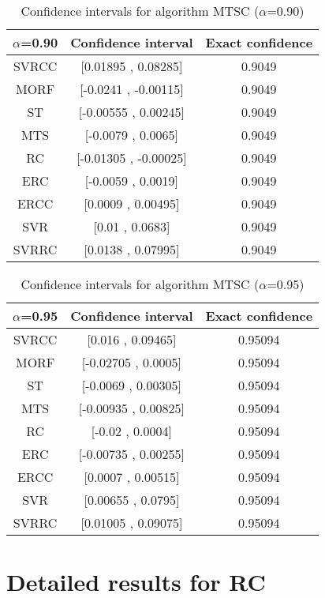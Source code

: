 \documentclass[a4paper,10pt]{article}
\begin{document}
\begin{table}[!htp]
\centering\small
\begin{tabular}{
|c|c|c|}
\hline
 $\alpha$=0.90 & Confidence interval & Exact confidence \\ \hline 
SVRCC & [0.01895 , 0.08285] & 0.9049\\ \hline 
MORF & [-0.0241 , -0.00115] & 0.9049\\ \hline 
ST & [-0.00555 , 0.00245] & 0.9049\\ \hline 
MTS & [-0.0079 , 0.0065] & 0.9049\\ \hline 
RC & [-0.01305 , -0.00025] & 0.9049\\ \hline 
ERC & [-0.0059 , 0.0019] & 0.9049\\ \hline 
ERCC & [0.0009 , 0.00495] & 0.9049\\ \hline 
SVR & [0.01 , 0.0683] & 0.9049\\ \hline 
SVRRC & [0.0138 , 0.07995] & 0.9049\\ \hline 

\end{tabular}
\caption{Confidence intervals for algorithm MTSC ($\alpha$=0.90)}
\end{table}
\begin{table}[!htp]
\centering\small
\begin{tabular}{
|c|c|c|}
\hline
 $\alpha$=0.95 & Confidence interval & Exact confidence \\ \hline 
SVRCC & [0.016 , 0.09465] & 0.95094\\ \hline 
MORF & [-0.02705 , 0.0005] & 0.95094\\ \hline 
ST & [-0.0069 , 0.00305] & 0.95094\\ \hline 
MTS & [-0.00935 , 0.00825] & 0.95094\\ \hline 
RC & [-0.02 , 0.0004] & 0.95094\\ \hline 
ERC & [-0.00735 , 0.00255] & 0.95094\\ \hline 
ERCC & [0.0007 , 0.00515] & 0.95094\\ \hline 
SVR & [0.00655 , 0.0795] & 0.95094\\ \hline 
SVRRC & [0.01005 , 0.09075] & 0.95094\\ \hline 

\end{tabular}
\caption{Confidence intervals for algorithm MTSC ($\alpha$=0.95)}
\end{table}

 \clearpage 


\section{Detailed results for RC}
\end{document}
